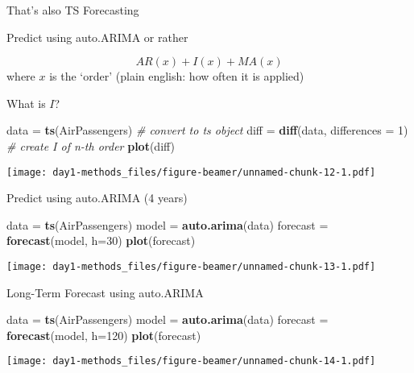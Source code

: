 \documentclass[ignorenonframetext,]{beamer}
\newenvironment{Shaded}{\begin{snugshade}}{\end{snugshade}}
\newcommand{\KeywordTok}[1]{\textcolor[rgb]{0.13,0.29,0.53}{\textbf{#1}}}
\newcommand{\DataTypeTok}[1]{\textcolor[rgb]{0.13,0.29,0.53}{#1}}
\newcommand{\DecValTok}[1]{\textcolor[rgb]{0.00,0.00,0.81}{#1}}
\newcommand{\StringTok}[1]{\textcolor[rgb]{0.31,0.60,0.02}{#1}}
\newcommand{\CommentTok}[1]{\textcolor[rgb]{0.56,0.35,0.01}{\textit{#1}}}
\newcommand{\NormalTok}[1]{#1}
\begin{document}
\begin{frame}[fragile]{That's also TS Forecasting}
\begin{block}{Predict using auto.ARIMA}
or rather

\[AR(x) + I(x) + MA(x)\] where \(x\) is the `order' (plain english: how
often it is applied)

\end{block}

\begin{block}{What is \(I\)?}

\begin{Shaded}
\begin{Highlighting}[]
\NormalTok{data =}\StringTok{ }\KeywordTok{ts}\NormalTok{(AirPassengers) }\CommentTok{# convert to ts object}
\NormalTok{diff =}\StringTok{ }\KeywordTok{diff}\NormalTok{(data, }\DataTypeTok{differences =} \DecValTok{1}\NormalTok{) }\CommentTok{# create I of n-th order}
\KeywordTok{plot}\NormalTok{(diff)}
\end{Highlighting}
\end{Shaded}

\texttt{[image: day1-methods\_files/figure-beamer/unnamed-chunk-12-1.pdf]}

\end{block}

\begin{block}{Predict using auto.ARIMA (4 years)}

\begin{Shaded}
\begin{Highlighting}[]
\NormalTok{data =}\StringTok{ }\KeywordTok{ts}\NormalTok{(AirPassengers)}
\NormalTok{model =}\StringTok{ }\KeywordTok{auto.arima}\NormalTok{(data)}
\NormalTok{forecast =}\StringTok{ }\KeywordTok{forecast}\NormalTok{(model, }\DataTypeTok{h=}\DecValTok{30}\NormalTok{)}
\KeywordTok{plot}\NormalTok{(forecast)}
\end{Highlighting}
\end{Shaded}

\texttt{[image: day1-methods\_files/figure-beamer/unnamed-chunk-13-1.pdf]}

\end{block}

\begin{block}{Long-Term Forecast using auto.ARIMA}

\begin{Shaded}
\begin{Highlighting}[]
\NormalTok{data =}\StringTok{ }\KeywordTok{ts}\NormalTok{(AirPassengers)}
\NormalTok{model =}\StringTok{ }\KeywordTok{auto.arima}\NormalTok{(data)}
\NormalTok{forecast =}\StringTok{ }\KeywordTok{forecast}\NormalTok{(model, }\DataTypeTok{h=}\DecValTok{120}\NormalTok{)}
\KeywordTok{plot}\NormalTok{(forecast)}
\end{Highlighting}
\end{Shaded}

\texttt{[image: day1-methods\_files/figure-beamer/unnamed-chunk-14-1.pdf]}

\end{block}

\end{frame}
\end{document}
